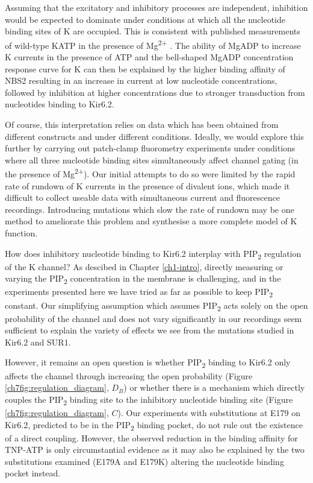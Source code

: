 Assuming that the excitatory and inhibitory processes are independent, inhibition would be expected to dominate under conditions at which all the nucleotide binding sites of K\ATP{} are occupied.
This is consistent with published measurements of wild-type KATP in the presence of Mg\textsuperscript{2+} \cite{proks_activation_2010}.
The ability of MgADP to increase K\ATP{} currents in the presence of ATP \cite{gribble_mgatp_1998-1} and the bell-shaped MgADP concentration response curve for K\ATP{} \cite{proks_activation_2010, vedovato_nucleotide-binding_2015} can then be explained by the higher binding affinity of NBS2 resulting in an increase in current at low nucleotide concentrations, followed by inhibition at higher concentrations due to stronger transduction from nucleotides binding to Kir6.2.

Of course, this interpretation relies on data which has been obtained from different constructs and under different conditions.
Ideally, we would explore this further by carrying out patch-clamp fluorometry experiments under conditions where all three nucleotide binding sites simultaneously affect channel gating (in the presence of Mg\textsuperscript{2+}).
Our initial attempts to do so were limited by the rapid rate of rundown of K\ATP{} currents in the presence of divalent ions, which made it difficult to collect useable data with simultaneous current and fluorescence recordings.
Introducing mutations which slow the rate of rundown may be one method to ameliorate this problem and synthesise a more complete model of K\ATP{} function.

How does inhibitory nucleotide binding to Kir6.2 interplay with PIP\textsubscript{2} regulation of the K\ATP{} channel?
As descibed in Chapter \ref{ch1-intro}, directly measuring or varying the PIP\textsubscript{2} concentration in the membrane is challenging, and in the experiments presented here we have tried as far as possible to keep PIP\textsubscript{2} constant.
Our simplifying assumption which assumes PIP\textsubscript{2} acts solely on the open probability of the channel and does not vary significantly in our recordings seem sufficient to explain the variety of effects we see from the mutations studied in Kir6.2 and SUR1.

However, it remains an open question is whether PIP\textsubscript{2} binding to Kir6.2 only affects the channel through increasing the open probability (Figure \ref{ch7fig:regulation_diagram}, $D_B$) or whether there is a mechanism which directly couples the PIP\textsubscript{2} binding site to the inhibitory nucleotide binding site (Figure \ref{ch7fig:regulation_diagram}, $C$).
Our experiments with substitutions at E179 on Kir6.2, predicted to be in the PIP\textsubscript{2} binding pocket, do not rule out the existence of a direct coupling.
However, the observed reduction in the binding affinity for TNP-ATP is only circumstantial evidence as it may also be explained by the two substitutions examined (E179A and E179K) altering the nucleotide binding pocket instead.